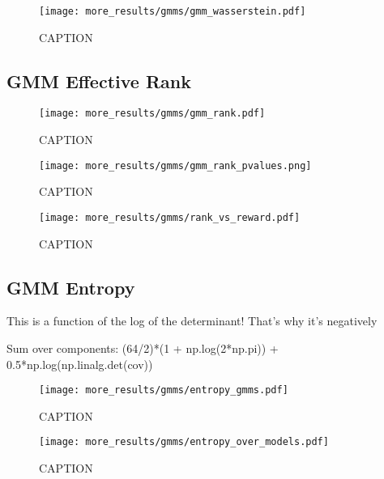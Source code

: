 \documentclass[../main.tex]{subfiles}
\begin{document}
\begin{figure}[tph]
  \centering
    \texttt{[image: more\_results/gmms/gmm\_wasserstein.pdf]}
    \caption[Wasserstein distance between GMMs]{CAPTION}\label{fig:gmm_w2}
\end{figure}


\subsection{GMM Effective Rank}

\begin{figure}[tph]
  \centering
    \texttt{[image: more\_results/gmms/gmm\_rank.pdf]}
    \caption[Effective rank of GMMs]{CAPTION}\label{fig:gmm_rank}
\end{figure}

\begin{figure}[tph]
  \centering
    \texttt{[image: more\_results/gmms/gmm\_rank\_pvalues.png]}
    \caption[Effective GMM rank significance matrix]{CAPTION}\label{fig:gmm_rank_pvalues}
\end{figure}

\begin{figure}[tph]
  \centering
    \texttt{[image: more\_results/gmms/rank\_vs\_reward.pdf]}
    \caption[Effective rank]{CAPTION}\label{fig:rank_vs_reward}
\end{figure}


\subsection{GMM Entropy}

This is a function of the log of the determinant! That's why it's negatively

Sum over components: (64/2)*(1 + np.log(2*np.pi)) + 0.5*np.log(np.linalg.det(cov))

\begin{figure}[tph]
  \centering
    \texttt{[image: more\_results/gmms/entropy\_gmms.pdf]}
    \caption[Entropy of subject GMMs]{CAPTION}\label{fig:gmm_entropy_vs_reward}
\end{figure}

\begin{figure}[tph]
  \centering
    \texttt{[image: more\_results/gmms/entropy\_over\_models.pdf]}
    \caption[Entropy of subject GMMs]{CAPTION}\label{fig:gmm_entropies}
\end{figure}
\end{document}
